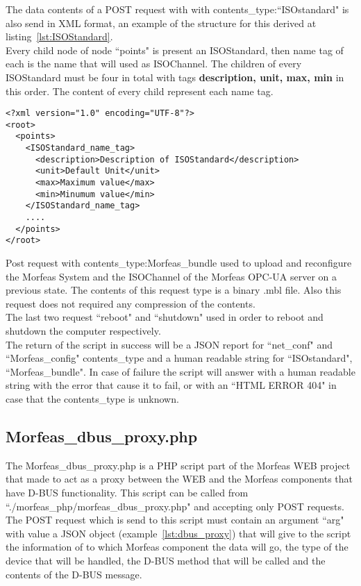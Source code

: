 The data contents of a POST request with with contents\_type:``ISOstandard" is also send in XML format, an example of the structure for this derived at listing~\ref{lst:ISOStandard}.\\
Every child node of node ``points" is present an ISOStandard, then name tag of each is the name that will used as ISOChannel. The children of every ISOStandard must be four in total
with tags \textbf{description, unit, max, min} in this order. The content of every child represent each name tag.

\begin{lstlisting}[frame=single,caption=Structure of contents for POST request with ``contents\_type:ISOstandard",label=lst:ISOStandard]
<?xml version="1.0" encoding="UTF-8"?>
<root>
  <points>
    <ISOStandard_name_tag>
      <description>Description of ISOStandard</description>
      <unit>Default Unit</unit>
      <max>Maximum value</max>
      <min>Minumum value</min>
    </ISOStandard_name_tag>
    ....
  </points>
</root>
\end{lstlisting}

Post request with contents\_type:Morfeas\_bundle used to upload and reconfigure the Morfeas System and the ISOChannel of the Morfeas OPC-UA server on a previous state.
The contents of this request type is a binary .mbl file. Also this request does not required any compression of the contents.\\

The last two request ``reboot" and ``shutdown" used in order to reboot and shutdown the computer respectively.\\

The return of the script in success will be a JSON report for ``net\_conf" and ``Morfeas\_config" contents\_type and a human readable string for ``ISOstandard", ``Morfeas\_bundle".
In case of failure the script will answer with a human readable string with the error that cause it to fail, or with an ``HTML ERROR 404" in case that the contents\_type is unknown.

\subsection{Morfeas\_dbus\_proxy.php}
The Morfeas\_dbus\_proxy.php is a PHP script part of the Morfeas WEB project that made to act as a proxy between the WEB and the Morfeas components that have D-BUS functionality.
This script can be called from ``./morfeas\_php/morfeas\_dbus\_proxy.php" and accepting only POST requests. The POST request which is send to this script must contain an argument ``arg"
with value a JSON object (example~\ref{lst:dbus_proxy}) that will give to the script the information of to which Morfeas component the data will go,
the type of the device that will be handled, the D-BUS method that will be called and the contents of the D-BUS message.

